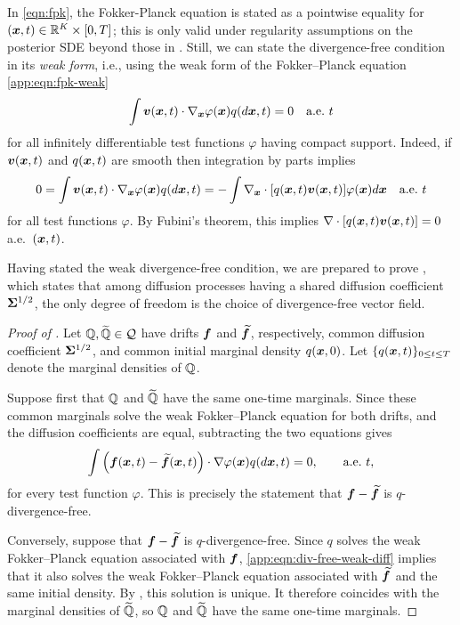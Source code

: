 In \cref{eqn:fpk}, the Fokker-Planck equation is stated as a pointwise equality for $(\boldsymbol{x}, t) \in \mathbb{R}^K \times [0, T]$; this is only valid under regularity assumptions on the posterior SDE beyond those in .
Still, we can state the divergence-free condition in its \emph{weak form}, i.e., using the weak form of the Fokker--Planck equation \cref{app:eqn:fpk-weak}
\begin{equation}\label{app:eqn:div-free-weak}
    \int \boldsymbol{v}(\boldsymbol{x}, t) \cdot \nabla_{\boldsymbol{x}} \varphi(\boldsymbol{x})  q( d\boldsymbol{x}, t)  = 0 \quad \text{a.e.~$t$}
\end{equation}
for all infinitely differentiable test functions $\varphi$ having compact support. Indeed, if $\boldsymbol{v}(\boldsymbol{x}, t)$ and $q(\boldsymbol{x}, t)$ are smooth then integration by parts implies
\begin{equation*}
    0 = \int \boldsymbol{v}(\boldsymbol{x}, t) \cdot \nabla_{\boldsymbol{x}} \varphi(\boldsymbol{x})  q(d\boldsymbol{x}, t) = - \int \nabla_{\boldsymbol{x}} \cdot[ q( \boldsymbol{x}, t) \boldsymbol{v}(\boldsymbol{x}, t)] \varphi(\boldsymbol{x})  d \boldsymbol{x} \quad \text{a.e.~$t$}
\end{equation*}
for all test functions $\varphi$. By Fubini's theorem, this implies $\nabla \cdot[ q( \boldsymbol{x}, t) \boldsymbol{v}(\boldsymbol{x}, t)] = 0$ a.e.~$(\boldsymbol{x}, t)$.

Having stated the weak divergence-free condition, we are prepared to prove , which states that among diffusion processes having a shared diffusion coefficient $\boldsymbol{\Sigma}^{1/2}$, the only degree of freedom is the choice of divergence-free vector field.

\begin{proof}[Proof of ]
Let $\mathbb{Q},\widetilde{\mathbb{Q}}\in\mathcal{Q}$ have drifts $\boldsymbol{f}$ and
$\widetilde{\boldsymbol{f}}$, respectively, common diffusion coefficient
$\boldsymbol{\Sigma}^{1/2}$, and common initial marginal density $q(\boldsymbol{x},0)$.
Let $\{q(\boldsymbol{x},t)\}_{0\leq t\leq T}$ denote the marginal densities of
$\mathbb{Q}$.

Suppose first that $\mathbb{Q}$ and $\widetilde{\mathbb{Q}}$ have the same one-time marginals. 
Since these common marginals solve the weak Fokker--Planck equation for both drifts, and the diffusion coefficients are equal, subtracting the two equations gives
\begin{equation}\label{app:eqn:div-free-weak-diff}
    \int \left(\boldsymbol{f}(\boldsymbol{x},t)-\widetilde{\boldsymbol{f}}(\boldsymbol{x},t)\right) \cdot\nabla\varphi(\boldsymbol{x}) q(d\boldsymbol{x},t) =0, \qquad\text{a.e.~$t$},
\end{equation}
for every test function $\varphi$. This is precisely the statement that $\boldsymbol{f}-\widetilde{\boldsymbol{f}}$ is $q$-divergence-free.

Conversely, suppose that $\boldsymbol{f}-\widetilde{\boldsymbol{f}}$ is $q$-divergence-free. 
Since $q$ solves the weak Fokker--Planck equation associated with $\boldsymbol{f}$, \cref{app:eqn:div-free-weak-diff} implies that it also solves the weak Fokker--Planck equation associated with $\widetilde{\boldsymbol{f}}$ and the same initial density. 
By , this solution is unique. 
It therefore coincides with the marginal densities of $\widetilde{\mathbb{Q}}$, so $\mathbb{Q}$ and $\widetilde{\mathbb{Q}}$ have the same one-time marginals.
\end{proof}

